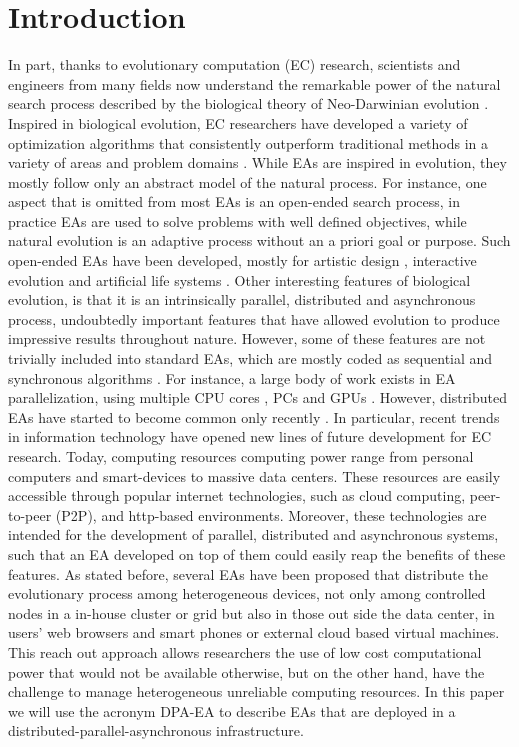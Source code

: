 \documentclass{sig-alternate}
\begin{document}
\section{Introduction}
\label{sec:intro}
In part, thanks to evolutionary computation (EC) research, scientists and engineers from many fields now understand the remarkable power of the natural search process described by the biological theory of Neo-Darwinian evolution \cite{}.
Inspired in biological evolution, EC researchers have developed a variety of optimization algorithms that consistently outperform traditional
methods in a variety of areas and problem domains \cite{}.
While EAs are inspired in evolution, they mostly follow only an abstract model of the natural process.
For instance, one aspect that is omitted from most EAs is an open-ended search process,
in practice EAs are used to solve problems with well defined objectives, while natural evolution is an adaptive process without an a priori goal or purpose.
Such open-ended EAs have been developed, mostly for artistic design \cite{}, interactive evolution \cite{} and artificial life systems \cite{}.
Other interesting features of biological evolution, is that it is an intrinsically parallel, distributed and asynchronous process,
undoubtedly important features that have allowed evolution to produce impressive results throughout nature.
However, some of these features are not trivially included into standard EAs, which are mostly coded as sequential and synchronous algorithms \cite{}.
For instance, a large body of work exists in EA parallelization, using multiple CPU cores \cite{}, PCs \cite{} and GPUs \cite{}.
However, distributed EAs have started to become common only recently \cite{}.
In particular, recent trends in information technology have opened new lines of future development for EC research.
Today, computing resources computing power range from personal computers and smart-devices to massive data centers.
These resources are easily accessible through popular internet technologies, such as cloud computing, 
peer-to-peer (P2P), and http-based environments.
Moreover, these technologies are intended for the development of parallel, distributed and asynchronous systems,
such that an EA developed on top of them could easily reap the benefits of these features.
As stated before, several EAs have been proposed that distribute  the evolutionary process among heterogeneous devices, not only among controlled
nodes in a in-house cluster or grid but also in those out side the data center, in users' web browsers and smart phones or external cloud based virtual machines.
This reach out approach allows researchers the use of low cost computational 
power that would not be available otherwise, but on the other hand, have the 
challenge to manage heterogeneous unreliable computing resources. 
In this paper we will use the acronym DPA-EA to describe EAs that are deployed in a distributed-parallel-asynchronous infrastructure.
\end{document}
